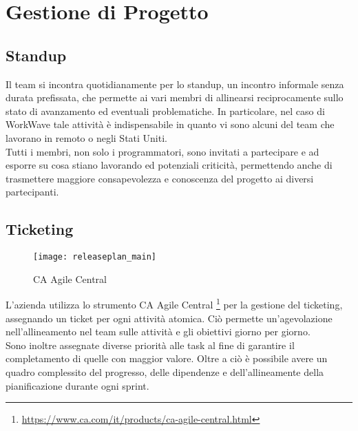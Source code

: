 \section{Gestione di Progetto}

\subsection{Standup}

Il team si incontra quotidianamente per lo standup, un incontro informale senza durata prefissata, che permette ai vari membri di allinearsi reciprocamente sullo stato di avanzamento ed eventuali problematiche. In particolare, nel caso di WorkWave tale attività è indispensabile in quanto vi sono alcuni del team che lavorano in remoto o negli Stati Uniti. \\

Tutti i membri, non solo i programmatori, sono invitati a partecipare e ad esporre su cosa stiano lavorando ed potenziali criticità, permettendo anche di trasmettere maggiore consapevolezza e conoscenza del progetto ai diversi partecipanti.

\subsection{Ticketing}

\begin{figure}[H] 
  \centering 
  \texttt{[image: releaseplan\_main]} 
  \caption{CA Agile Central}
\end{figure}

L'azienda utilizza lo strumento CA Agile Central \footnote{ \url{https://www.ca.com/it/products/ca-agile-central.html}} per la gestione del ticketing, assegnando un ticket per ogni attività atomica. Ciò permette un'agevolazione nell'allineamento nel team sulle attività e gli obiettivi giorno per giorno. \\

Sono inoltre assegnate diverse priorità alle task al fine di garantire il completamento di quelle con maggior valore. Oltre a ciò è possibile avere un quadro complessito del progresso, delle dipendenze e dell'allineamente della pianificazione durante ogni \gls{sprint}.
